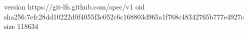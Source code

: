 version https://git-lfs.github.com/spec/v1
oid sha256:7efc28dd10222d0f4055f3c052c6c168803d965a1f768c48342765b777e4927c
size 118634

